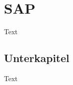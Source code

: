 \chapter{SAP}
\label{Kapitel:Einleitung}
Text


\section{Unterkapitel}
\label{Abschnitt:Motivation}


Text
